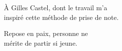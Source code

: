À Gilles Castel, dont le travail m'a \\
inspiré cette méthode de prise de note.

\vspace{1em}

Repose en paix, personne ne \\
mérite de partir si jeune.